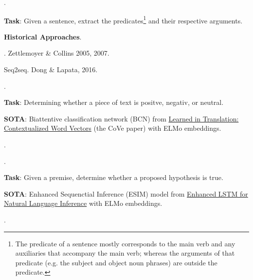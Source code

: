 \documentclass[11pt]{article}
\begin{document}
\myspace
\p {}. 
\begin{compactitem}
	\item \textbf{Task}: Given a sentence, extract the predicates\footnote{The predicate of a sentence mostly corresponds to the main verb and any auxiliaries that accompany the main verb; whereas the arguments of that predicate (e.g. the subject and object noun phrases) are outside the predicate.} and their respective arguments. 
	
	\item \textbf{Historical Approaches}.
	\begin{compactitem}
		\item {}. Zettlemoyer \& Collins 2005, 2007. 
		
		\item Seq2seq. Dong \& Lapata, 2016. 
	\end{compactitem}
\end{compactitem}

\myspace
\p {}. 
\begin{compactitem}
	\item \textbf{Task}: Determining whether a piece of text is positve, negativ, or neutral. 
	
	\item \textbf{SOTA}: Biattentive classification network (BCN) from \href{https://arxiv.org/abs/1708.00107}{Learned in Translation: Contextualized Word Vectors} (the CoVe paper) with ELMo embeddings.
\end{compactitem}

\myspace
\p {}. 

\myspace
\p {}. 
\begin{compactitem}
	\item \textbf{Task}: Given a premise, determine whether a proposed hypothesis is true. 
	
	\item \textbf{SOTA}: Enhanced Sequenctial Inference (ESIM) model from \href{https://arxiv.org/abs/1609.06038}{
		Enhanced LSTM for Natural Language Inference} with ELMo embeddings.
\end{compactitem}

\myspace 
\p {}. 
\end{document}
